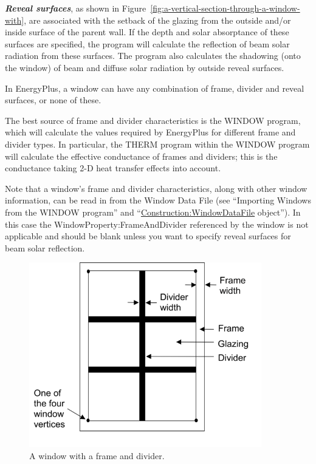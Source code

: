 \textbf{\emph{Reveal surfaces}}, as shown in Figure~\ref{fig:a-vertical-section-through-a-window-with}, are associated with the setback of the glazing from the outside and/or inside surface of the parent wall. If the depth and solar absorptance of these surfaces are specified, the program will calculate the reflection of beam solar radiation from these surfaces. The program also calculates the shadowing (onto the window) of beam and diffuse solar radiation by outside reveal surfaces.

In EnergyPlus, a window can have any combination of frame, divider and reveal surfaces, or none of these.

The best source of frame and divider characteristics is the WINDOW program, which will calculate the values required by EnergyPlus for different frame and divider types. In particular, the THERM program within the WINDOW program will calculate the effective conductance of frames and dividers; this is the conductance taking 2-D heat transfer effects into account.

Note that a window's frame and divider characteristics, along with other window information, can be read in from the Window Data File (see ``Importing Windows from the WINDOW program'' and ``\hyperref[constructionwindowdatafile]{Construction:WindowDataFile} object''). In this case the WindowProperty:FrameAndDivider referenced by the window is not applicable and should be blank unless you want to specify reveal surfaces for beam solar reflection.

\begin{figure}[hbtp] %
\centering
\includegraphics[width=0.9\textwidth, height=0.9\textheight, keepaspectratio=true]{media/image061.png}
\caption{A window with a frame and divider. \protect \label{fig:a-window-with-a-frame-and-divider.}}
\end{figure}

